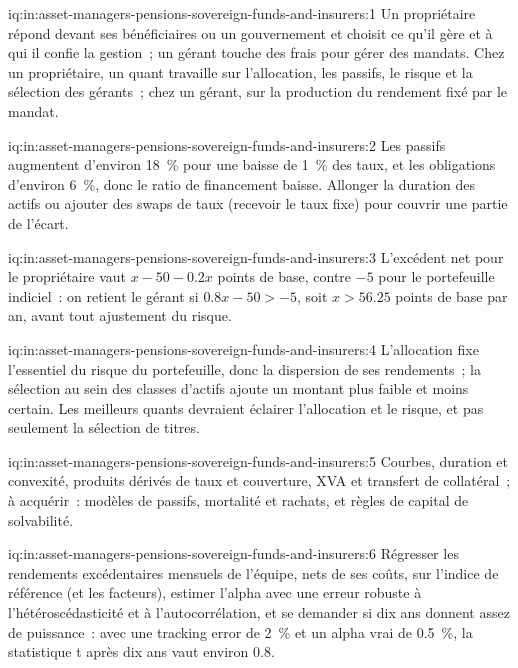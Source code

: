 \begin{solution}{iq:in:asset-managers-pensions-sovereign-funds-and-insurers:1}
Un propriétaire répond devant ses bénéficiaires ou un gouvernement et choisit ce qu'il gère et à qui il confie la gestion~; un gérant touche des frais
pour gérer des mandats. Chez un propriétaire, un quant travaille sur l'allocation, les passifs, le risque et la sélection des gérants~; chez un gérant, sur
la production du rendement fixé par le mandat.
\end{solution}

\begin{solution}{iq:in:asset-managers-pensions-sovereign-funds-and-insurers:2}
Les passifs augmentent d'environ 18~\% pour une baisse de 1~\% des taux, et les obligations d'environ 6~\%, donc le ratio de financement baisse. Allonger la
duration des actifs ou ajouter des swaps de taux (recevoir le taux fixe) pour couvrir une partie de l'écart.
\end{solution}

\begin{solution}{iq:in:asset-managers-pensions-sovereign-funds-and-insurers:3}
L'excédent net pour le propriétaire vaut $x-50-0.2x$ points de base, contre $-5$ pour le portefeuille indiciel~: on retient le gérant si $0.8x-50>-5$, soit
$x>56.25$ points de base par an, avant tout ajustement du risque.
\end{solution}

\begin{solution}{iq:in:asset-managers-pensions-sovereign-funds-and-insurers:4}
L'allocation fixe l'essentiel du risque du portefeuille, donc la dispersion de ses rendements~; la sélection au sein des classes d'actifs ajoute
un montant plus faible et moins certain. Les meilleurs quants devraient éclairer l'allocation et le risque, et pas seulement la sélection de titres.
\end{solution}

\begin{solution}{iq:in:asset-managers-pensions-sovereign-funds-and-insurers:5}
Courbes, duration et convexité, produits dérivés de taux et couverture, XVA et transfert de collatéral~; à acquérir~: modèles de passifs,
mortalité et rachats, et règles de capital de solvabilité.
\end{solution}

\begin{solution}{iq:in:asset-managers-pensions-sovereign-funds-and-insurers:6}
Régresser les rendements excédentaires mensuels de l'équipe, nets de ses coûts, sur l'indice de référence (et les facteurs), estimer l'alpha avec une
erreur robuste à l'hétéroscédasticité et à l'autocorrélation, et se demander si dix ans donnent assez de puissance~: avec une tracking error de
2~\% et un alpha vrai de 0.5~\%, la statistique t après dix ans vaut environ 0.8.
\end{solution}
